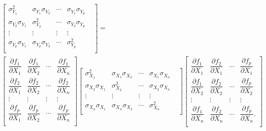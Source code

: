\begin{eqnarray}
& &
\begin{bmatrix}
\sigma_{Y_{1}}^{2} & \sigma_{Y_{1}}\sigma_{Y_{2}} & \cdots & \sigma_{Y_{1}}\sigma_{Y_{p}}\\
\sigma_{Y_{2}}\sigma_{Y_{1}} & \sigma_{Y_{2}}^{2} &  \cdots & \sigma_{Y_{2}}\sigma_{Y_{p}}\\
\vdots & \vdots & \vdots & \vdots \\
\sigma_{Y_{p}}\sigma_{Y_{1}} & \sigma_{Y_{p}}\sigma_{Y_{2}} & \cdots & \sigma_{Y_{p}}^{2} & \\
\end{bmatrix} = \\ \nonumber
& &
\begin{bmatrix}
\dfrac{\partial f_{1}}{\partial X_{1}} & \dfrac{\partial f_{1}}{\partial X_{2}} & \cdots & \dfrac{\partial f_{1}}{\partial X_{n}} \\
\dfrac{\partial f_{2}}{\partial X_{1}} & \dfrac{\partial f_{2}}{\partial X_{2}} & \cdots & \dfrac{\partial f_{2}}{\partial X_{n}} \\
\vdots & \vdots & \vdots & \vdots \\
\dfrac{\partial f_{p}}{\partial X_{1}} & \dfrac{\partial f_{p}}{\partial X_{2}} & \cdots & \dfrac{\partial f_{p}}{\partial X_{n}} \\
\end{bmatrix}
\begin{bmatrix}
\sigma_{X_{1}}^{2} & \sigma_{X_{1}}\sigma_{X_{2}} & \cdots & \sigma_{X_{1}}\sigma_{X_{n}}\\
\sigma_{X_{2}}\sigma_{X_{1}} & \sigma_{X_{2}}^{2} &  \cdots & \sigma_{X_{2}}\sigma_{X_{n}}\\
\vdots & \vdots & \vdots & \vdots \\
\sigma_{X_{n}}\sigma_{X_{1}} & \sigma_{X_{n}}\sigma_{X_{2}} & \cdots & \sigma_{X_{n}}^{2} & \\
\end{bmatrix}
\begin{bmatrix}
\dfrac{\partial f_{1}}{\partial X_{1}} & \dfrac{\partial f_{2}}{\partial X_{1}} & \cdots & \dfrac{\partial f_{p}}{\partial X_{1}} \\
\dfrac{\partial f_{1}}{\partial X_{2}} & \dfrac{\partial f_{2}}{\partial X_{2}} & \cdots & \dfrac{\partial f_{p}}{\partial X_{2}} \\
\vdots & \vdots & \vdots & \vdots \\
\dfrac{\partial f_{1}}{\partial X_{n}} & \dfrac{\partial f_{2}}{\partial X_{n}} &  \cdots & \dfrac{\partial f_{p}}{\partial X_{n}}.\\
\end{bmatrix}
\end{eqnarray}


